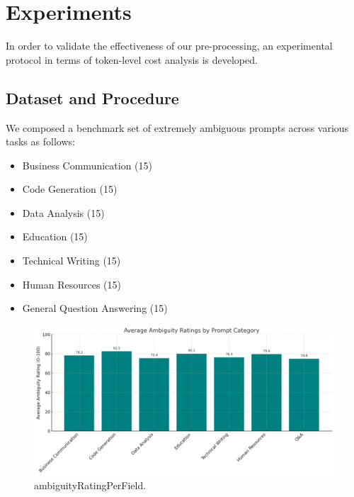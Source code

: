 \documentclass[conference]{IEEEtran}
\begin{document}
\section{Experiments}
In order to validate the effectiveness of our pre-processing, an experimental protocol in terms of token-level cost analysis is developed.

\subsection{Dataset and Procedure}
We composed a benchmark set of extremely ambiguous prompts across various tasks as follows:
\begin{itemize}
    \item Business Communication (15)
    \item Code Generation (15)
    \item Data Analysis (15)
    \item Education (15)
    \item Technical Writing (15)
    \item Human Resources (15)
    \item General Question Answering (15)
\end{itemize}

\begin{figure}[!t]
\centering
\includegraphics[width=\columnwidth]{images/Figure3.jpeg}
\caption{ambiguityRatingPerField.}
\label{fig_ratingperfield}
\end{figure}
\end{document}
